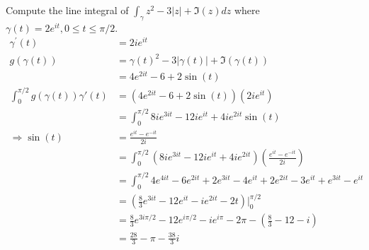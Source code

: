 \begin{example}
    Compute the line integral of $\int_{\gamma} z^2 - 3|z| + \Im (z) dz$ where $\gamma(t) = 2e^{it}, 0 \leq t \leq \pi/2$.
    \begin{align*}
        \gamma^{\prime} (t)                     & = 2ie^{it}                                                                                                \\
        g(\gamma(t))                            & = \gamma(t)^2 - 3|\gamma(t)| + \Im(\gamma(t))                                                             \\
                                                & = 4e^{2it} - 6 + 2\sin(t)                                                                                 \\
        \int_{0}^{\pi/2}g(\gamma(t)) \gamma'(t) & = (4e^{2it} - 6 + 2\sin(t))(2ie^{it})                                                                     \\
                                                & = \int_{0}^{\pi/2} 8ie^{3it} - 12ie^{it} + 4ie^{2it}\sin(t)                                               \\
        \Rightarrow \sin(t)                     & = \frac{e^{it} - e^{-it}}{2i}                                                                             \\
                                                & = \int_{0}^{\pi/2}\left( 8ie^{3it} - 12ie^{it} + 4ie^{2it}\right)\left(\frac{e^{it} - e^{-it}}{2i}\right) \\
                                                & = \int_{0}^{\pi/2} 4e^{4it} - 6e^{2it} + 2e^{3it} - 4e^{it} + 2e^{2it} - 3e^{it} + e^{3it} - e^{it}       \\
                                                & = \left(\frac{8}{3}e^{3it} - 12e^{it} - ie^{2it} - 2t\right) |_{0}^{\pi/2}                                \\
                                                & = \frac{8}{3}e^{3i\pi/2} - 12e^{i\pi/2} - ie^{i\pi} - 2\pi - \left(\frac{8}{3} - 12 - i \right)           \\
                                                & = \frac{28}{3} - \pi - \frac{38}{3}i
    \end{align*}

\end{example}

